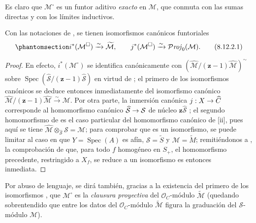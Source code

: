 \documentclass[oneside,10pt]{amsart}
\makeatletter
\newcommand{\ega@arrow}[2]{\mathchoice{#1}{#2}{#2}{#2}}
\renewcommand{\to}{\ega@arrow{\longrightarrow}{\rightarrow}}
\newcommand{\oldpage}[2][]{\marginnote{\normalfont\footnotesize\textbf{#1}~|~#2}\ignorespaces}
\let\EGAOriginalLabel\label
\renewcommand{\label}[1]{\phantomsection\EGAOriginalLabel{#1}}
\makeatother
\begin{document}
\begin{env}[8.12.1]
Es claro  que $\mathcal{M}^{\square}$ es un funtor aditivo \emph{exacto} en $\mathcal{M}$, que conmuta con las sumas directas y con los límites inductivos.
\end{env}

\begin{proposition}[8.12.2]
\label{II.8.12.2-fr}
Con las notaciones de , se tienen isomorfismos canónicos funtoriales
\begin{equation}
\label{II.8.12.2.1-fr}
  i^*(\mathcal{M}^{\square})\xrightarrow{\sim}\widetilde{\mathcal{M}},
  \qquad
  j^*(\mathcal{M}^{\square})\xrightarrow{\sim}
  \mathcal{P}\mathit{roj}_0(\mathcal{M}).
\tag{8.12.2.1}
\end{equation}
\end{proposition}

\begin{proof}
En efecto, $i^*(\mathcal{M}^{\square})$ se identifica canónicamente con $\left(\widehat{\mathcal{M}}/(\mathbf{z}-1)\widehat{\mathcal{M}}\right)^{\sim}$ sobre $\operatorname{Spec}(\widehat{\mathcal{S}}/(\mathbf{z}-1)\widehat{\mathcal{S}})$ en virtud de ;
el primero de los isomorfismos canónicos  se deduce entonces inmediatamente  del isomorfismo canónico $\widehat{\mathcal{M}}/(\mathbf{z}-1)\widehat{\mathcal{M}}
\xrightarrow{\sim}\mathcal{M}$.
Por otra parte, la inmersión canónica $j:X\to\widehat{C}$ corresponde al homomorfismo canónico $\widehat{\mathcal{S}}\to\mathcal{S}$ de núcleo $\mathbf{z}\widehat{\mathcal{S}}$ ;
el segundo homomorfismo de  es el caso particular del homomorfismo canónico de [ii], pues aquí se tiene $\widehat{\mathcal{M}}\otimes_{\widehat{\mathcal{S}}}\mathcal{S}
=\mathcal{M}$;
para comprobar que es un isomorfismo, se puede limitar al caso en que $Y=\operatorname{Spec}(A)$ es afín, $\mathcal{S}=\widetilde{S}$ y $\mathcal{M}=\widetilde{M}$;
remitiéndonos a , la comprobación de que, para todo $f$ homogéneo en $S_+$, el homomorfismo precedente, restringido a $X_f$, se reduce a un isomorfismo es entonces inmediata.
\end{proof}
\oldpage[II]{193}

Por abuso de lenguaje, se dirá también, gracias a la existencia del primero de los isomorfismos , que $\mathcal{M}^{\square}$ es la \emph{clausura proyectiva} del $\mathcal{O}_C$-módulo $\widetilde{\mathcal{M}}$ (quedando sobrentendido que entre los datos del $\mathcal{O}_C$-módulo $\widetilde{\mathcal{M}}$ figura la graduación del $\mathcal{S}$-módulo $\mathcal{M}$).
\end{document}
